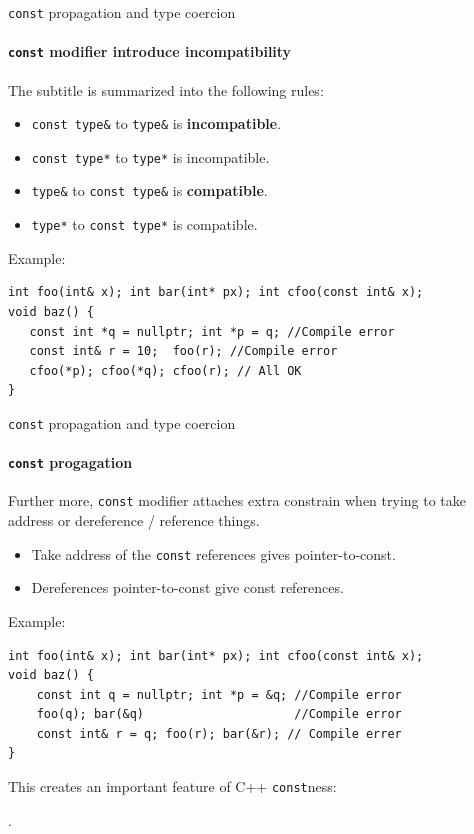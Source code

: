 \begin{frame}[fragile]{\texttt{const} propagation and type coercion}
\framesubtitle{\texttt{const} modifier introduce incompatibility}

	The subtitle is summarized into the following rules:
	
	\begin{itemize}
		\item \texttt{const type\&} to \texttt{type\&} is \textbf{incompatible}.
		\item \texttt{const type*} to \texttt{type*} is incompatible.
		\item \texttt{type\&} to \texttt{const type\&} is \textbf{compatible}.
		\item \texttt{type*} to \texttt{const type*} is compatible.
	\end{itemize}
Example:
\begin{verbatim}
int foo(int& x); int bar(int* px); int cfoo(const int& x);
void baz() {
   const int *q = nullptr; int *p = q; //Compile error
   const int& r = 10;  foo(r); //Compile error
   cfoo(*p); cfoo(*q); cfoo(r); // All OK
}
\end{verbatim}

\end{frame}



\begin{frame}[fragile]{\texttt{const} propagation and type coercion}
\framesubtitle{\texttt{const} progagation}
Further more, \texttt{const} modifier attaches extra constrain when trying to take address or dereference / reference things.

\begin{itemize}
\item Take address of the \texttt{const} references gives pointer-to-const.
\item Dereferences pointer-to-const give const references.
\end{itemize}
Example:
\begin{verbatim}
int foo(int& x); int bar(int* px); int cfoo(const int& x);
void baz() {
    const int q = nullptr; int *p = &q; //Compile error
    foo(q); bar(&q)                     //Compile error
    const int& r = q; foo(r); bar(&r); // Compile errer
}
\end{verbatim}
This creates an important feature of C++ \texttt{const}ness:

 .
\end{frame}

